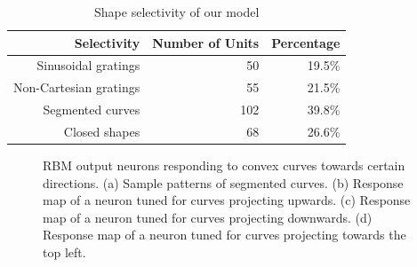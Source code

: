 \documentclass[conference]{IEEEtran}
\begin{document}
\begin{table}[h]
\caption{Shape selectivity of our model}
\centering
\begin{tabular}{rrr}
\toprule
Selectivity & Number of Units & Percentage \\
\midrule
Sinusoidal gratings & 50 & 19.5\% \\
Non-Cartesian gratings & 55 & 21.5\% \\
Segmented curves & 102 & 39.8\% \\
Closed shapes & 68 & 26.6\% \\
\bottomrule
\end{tabular}
\label{tab:2}
\end{table}

\begin{figure}[htp]
\centering
{}\hfil
{}\hfil
{}\hfil
{}
\caption{RBM output neurons responding to convex curves towards certain directions.
(a) Sample patterns of segmented curves.
(b) Response map of a neuron tuned for curves projecting upwards.
(c) Response map of a neuron tuned for curves projecting downwards.
(d) Response map of a neuron tuned for curves projecting towards the top left.}
\label{fig:8}
\end{figure}
\end{document}
